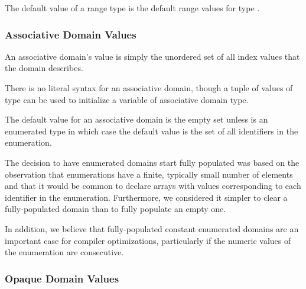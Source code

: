 
The default value of a range type is the  default range
values for type  
.


\subsubsection{Associative Domain Values}
\label{Associative_Domain_Values}

An associative domain's value is simply the unordered set of all index
values that the domain describes.


There is no literal syntax for an associative domain, though a tuple
of values of type  can be used to initialize a variable
of associative domain type.



The default value for an associative domain is the empty set unless
 is an enumerated type in which case the default value
is the set of all identifiers in the enumeration.

\begin{rationale}

The decision to have enumerated domains start fully populated was
based on the observation that enumerations have a finite, typically
small number of elements and that it would be common to declare arrays
with values corresponding to each identifier in the enumeration.
Furthermore, we considered it simpler to clear a fully-populated
domain than to fully populate an empty one.

In addition, we believe that fully-populated constant enumerated
domains are an important case for compiler optimizations, particularly
if the numeric values of the enumeration are consecutive.

\end{rationale}


\subsubsection{Opaque Domain Values}
\label{Opaque_Domain_Values}

